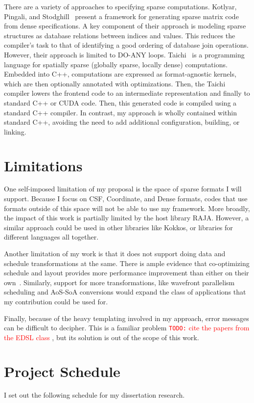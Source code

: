 \documentclass{article}
\newcommand{\todo}[1]{{\textcolor{red}{{\tt{TODO:}}\,\,#1 }}}
\begin{document}
There are a variety of approaches to specifying sparse computations.
Kotlyar, Pingali, and Stodghill~\cite{kotlyar1997relational} present a framework for generating sparse matrix code from dense specifications.
A key component of their approach is modeling sparse structures as database relations between indices and values. 
This reduces the compiler's task to that of identifying a good ordering of database join operations.
However, their approach is limited to DO-ANY loops.
Taichi~\cite{hu2019taichi} is a programming language for spatially sparse (globally sparse, locally dense) computations.
Embedded into C++, computations are expressed as format-agnostic kernels, which are then optionally annotated with optimizations.
Then, the Taichi compiler lowers the frontend code to an intermediate representation and finally to standard C++ or CUDA code. 
Then, this generated code is compiled using a standard C++ compiler.
In contrast, my approach is wholly contained within standard C++, avoiding the need to add additional configuration, building, or linking.

\section{Limitations}
\label{Sec:Limitations}
One self-imposed limitation of my proposal is the space of sparse formats I will support.
Because I focus on CSF, Coordinate, and Dense formats, codes that use formats outside of this space will not be able to use my framework.
More broadly, the impact of this work is partially limited by the host library RAJA. 
However, a similar approach could be used in other libraries like Kokkos, or libraries for different languages all together.

Another limitation of my work is that it does not support doing data and schedule transformations at the same. 
There is ample evidence that co-optimizing schedule and layout provides more performance improvement than either on their own~\cite{shirako2019integrating}.
Similarly, support for more transformations, like wavefront parallelism scheduling and AoS-SoA conversions would expand the class of applications that my contribution could be used for.

Finally, because of the heavy templating involved in my approach, error messages can be difficult to decipher. 
This is a familiar problem \todo{cite the papers from the EDSL class}, but its solution is out of the scope of this work.


\section{Project Schedule}
\label{Sec:Schedule}
I set out the following schedule for my dissertation research.
\end{document}
